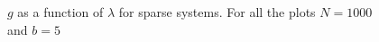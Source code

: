 \documentclass[onecolumn,fleqn]{revtex4}
\begin{document}
\begin{figure}[H]
{  }
  \caption{$g$ as a function of $\lambda$ for sparse systems.
  For all the plots $N=1000$ and $b=5$}
\end{figure}
\end{document}
